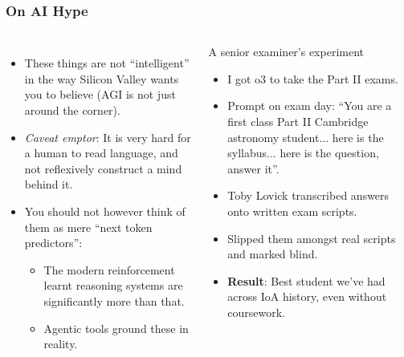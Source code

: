 \documentclass[aspectratio=169]{beamer}
\begin{document}
\begin{frame}
    \frametitle{On AI Hype}
    \begin{columns}
        \begin{itemize}
            \item These things are not ``intelligent'' in the way Silicon Valley wants you to believe (AGI is not just around the corner).
            \item \emph{Caveat emptor}: It is very hard for a human to read language, and not reflexively construct a mind behind it.
            \item You should not however think of them as mere ``next token predictors'':
                \begin{itemize}
                    \item The modern reinforcement learnt reasoning systems are significantly more than that.
                    \item Agentic tools ground these in reality.
                \end{itemize}
        \end{itemize}
        
        \begin{block}{A senior examiner's experiment}
            \begin{itemize}
                \item I got o3 to take the Part II exams.
                \item Prompt on exam day: ``You are a first class Part II Cambridge astronomy student... here is the syllabus... here is the question, answer it''.
                \item Toby Lovick transcribed answers onto written exam scripts.
                \item Slipped them amongst real scripts and marked blind.
                \item \textbf{Result}: Best student we've had across IoA history, even without coursework.
            \end{itemize}
        \end{block}
    \end{columns}
\end{frame}
\end{document}
